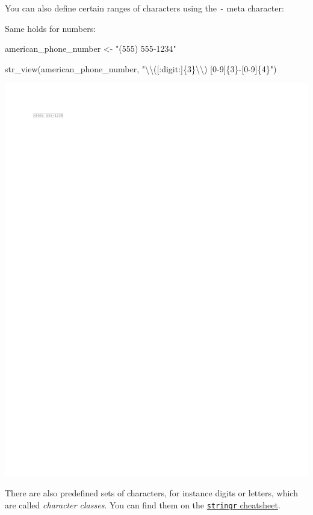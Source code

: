\documentclass[
]{book}
\newenvironment{Shaded}{\begin{snugshade}}{\end{snugshade}}
\newcommand{\FunctionTok}[1]{\textcolor[rgb]{0.00,0.00,0.00}{#1}}
\newcommand{\NormalTok}[1]{#1}
\newcommand{\OtherTok}[1]{\textcolor[rgb]{0.56,0.35,0.01}{#1}}
\newcommand{\SpecialCharTok}[1]{\textcolor[rgb]{0.00,0.00,0.00}{#1}}
\newcommand{\StringTok}[1]{\textcolor[rgb]{0.31,0.60,0.02}{#1}}
\begin{document}
You can also define certain ranges of characters using the \texttt{-} meta character:

Same holds for numbers:

\begin{Shaded}
\begin{Highlighting}[]
\NormalTok{american\_phone\_number }\OtherTok{\textless{}{-}} \StringTok{"(555) 555{-}1234"}

\FunctionTok{str\_view}\NormalTok{(american\_phone\_number, }\StringTok{"}\SpecialCharTok{\textbackslash{}\textbackslash{}}\StringTok{([:digit:]\{3\}}\SpecialCharTok{\textbackslash{}\textbackslash{}}\StringTok{) [0{-}9]\{3\}{-}[0{-}9]\{4\}"}\NormalTok{)}
\end{Highlighting}
\end{Shaded}

\includegraphics{_main_files/figure-latex/unnamed-chunk-30-1.pdf}

There are also predefined sets of characters, for instance digits or letters, which are called \emph{character classes}. You can find them on the \href{https://github.com/rstudio/cheatsheets/blob/master/strings.pdf}{\texttt{stringr} cheatsheet}.
\end{document}
